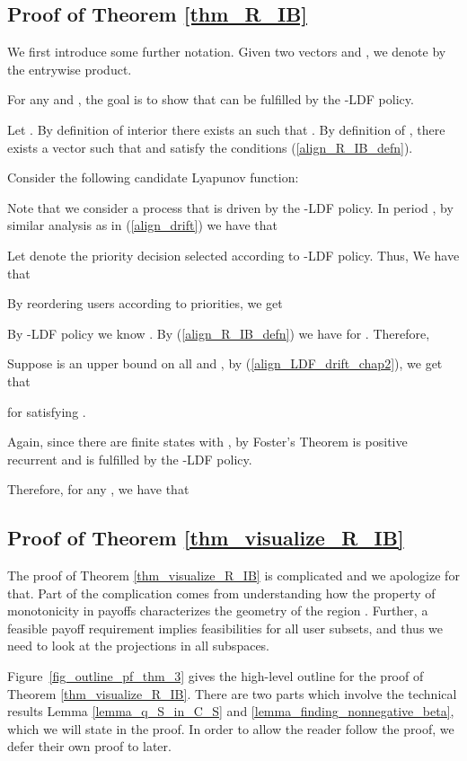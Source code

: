 \documentclass[prodmode,acmtompecs]{acmsmall}
\begin{document}
\subsection{Proof of Theorem \ref{thm_R_IB}}
\label{appendix_pf_thm_R_IB_chap2}
We first introduce some further notation. Given two vectors  and , we denote by  the entrywise product. 

For any  and , the goal is to show that  can be fulfilled by the -LDF policy. 

Let . 
By definition of interior there exists an  such that . 
By definition of , there exists a vector  such that  and  satisfy the conditions (\ref{align_R_IB_defn}). 

Consider the following candidate Lyapunov function: 


Note that we consider a process  that is driven by the -LDF policy. In period , by similar analysis as in (\ref{align_drift}) we have that


Let  denote the priority decision selected according to -LDF policy. Thus, We have that

By reordering users according to priorities, we get


By -LDF policy we know . By (\ref{align_R_IB_defn}) we have  for . Therefore, 



Suppose  is an upper bound on all  and , by (\ref{align_LDF_drift_chap2}), we get that

for  satisfying . 

Again, since there are finite states  with , by Foster's Theorem  is positive recurrent and  is fulfilled by the -LDF policy. 

Therefore, for any , we have that


\subsection{Proof of Theorem \ref{thm_visualize_R_IB}}
\label{appendix_pf_thm_visualize_R_IB}
The proof of Theorem \ref{thm_visualize_R_IB} is complicated and we apologize for that. Part of the complication comes from understanding how the property of monotonicity in payoffs characterizes the geometry of the region . Further, a feasible payoff requirement implies feasibilities for all user subsets, and thus we need to look at the projections in all subspaces. 

Figure~\ref{fig_outline_pf_thm_3} gives the high-level outline for the proof of Theorem \ref{thm_visualize_R_IB}. There are two parts which involve the technical results Lemma \ref{lemma_q_S_in_C_S} and \ref{lemma_finding_nonnegative_beta}, which we will state in the proof. In order to allow the reader follow the proof, we defer their own proof to later. 
\end{document}
